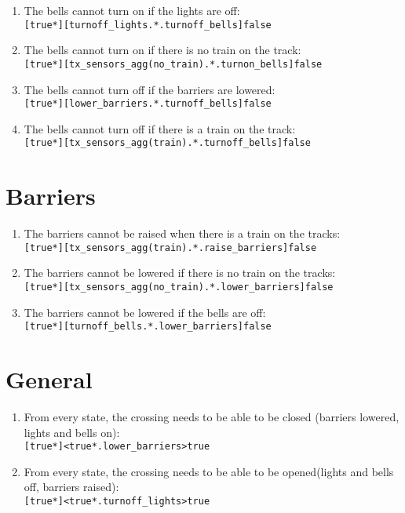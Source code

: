 \documentclass[final]{report}
\begin{document}
\begin{enumerate}
    \item The bells cannot turn on if the lights are off:\\
        \texttt{[true*][turnoff\_lights.*.turnoff\_bells]false}

    \item The bells cannot turn on if there is no train on the track:\\
        \texttt{[true*][tx\_sensors\_agg(no\_train).*.turnon\_bells]false}

    \item The bells cannot turn off if the barriers are lowered:\\
        \texttt{[true*][lower\_barriers.*.turnoff\_bells]false}

    \item The bells cannot turn off if there is a train on the track:\\
        \texttt{[true*][tx\_sensors\_agg(train).*.turnoff\_bells]false}
\end{enumerate}


\section{Barriers}

\begin{enumerate}
    \item The barriers cannot be raised when there is a train on the tracks:\\
        \texttt{[true*][tx\_sensors\_agg(train).*.raise\_barriers]false}

    \item The barriers cannot be lowered if there is no train on the tracks:\\
        \texttt{[true*][tx\_sensors\_agg(no\_train).*.lower\_barriers]false}

    \item The barriers cannot be lowered if the bells are off:\\
        \texttt{[true*][turnoff\_bells.*.lower\_barriers]false}
\end{enumerate}


\section{General}

\begin{enumerate}
    \item From every state, the crossing needs to be able to be closed (barriers lowered, lights and bells on):\\
        \texttt{[true*]<true*.lower\_barriers>true}

    \item From every state, the crossing needs to be able to be opened(lights and bells off, barriers raised):\\
        \texttt{[true*]<true*.turnoff\_lights>true}
\end{enumerate}
\end{document}
